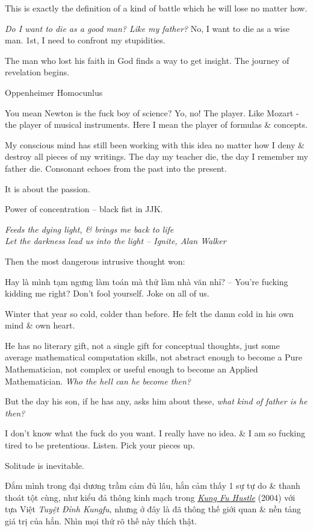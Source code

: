\documentclass[12pt,oneside]{book}
\begin{document}
This is exactly the definition of a kind of battle which he will lose no matter how.

{\it Do I want to die as a good man? Like my father?} No, I want to die as a wise man. 1st, I need to confront my stupidities.

The man who lost his faith in God finds a way to get insight. The journey of revelation begins.

Oppenheimer Homocunlus

You mean Newton is the fuck boy of science? Yo, no! The player. Like Mozart - the player of musical instruments. Here I mean the player of formulas \& concepts.

My conscious mind has still been working with this idea no matter how I deny \& destroy all pieces of my writings. The day my teacher die, the day I remember my father die. Consonant echoes from the past into the present. 

It is about the passion.

Power of concentration -- black fist in JJK.

\begin{center}\it
	Feeds the dying light, \& brings me back to life\\
	Let the darkness lead us into the light 
	-- Ignite, {\sc Alan Walker}
\end{center}
Then the most dangerous intrusive thought won:

Hay là mình tạm ngưng làm toán mà thử làm nhà văn nhỉ? -- You're fucking kidding me right? Don't fool yourself. Joke on all of us.

Winter that year so cold, colder than before. He felt the damn cold in his own mind \& own heart.

He has no literary gift, not a single gift for conceptual thoughts, just some average mathematical computation skills, not abstract enough to become a Pure Mathematician, not complex or useful enough to become an Applied Mathematician. {\it Who the hell can he become then?}

But the day his son, if he has any, asks him about these, {\it what kind of father is he then?}

I don't know what the fuck do you want. I really have no idea. \& I am so fucking tired to be pretentious. Listen. Pick your pieces up.

Solitude is inevitable.

Đắm mình trong đại dương trầm cảm đủ lâu, hắn cảm thấy 1 sự tự do \& thanh thoát tột cùng, như kiểu đả thông kinh mạch trong \href{https://www.imdb.com/title/tt0373074/}{\it Kung Fu Hustle} (2004) với tựa Việt {\it Tuyệt Đỉnh Kungfu}, nhưng ở đây là đã thông thế giới quan \& nền tảng giá trị của hắn. Nhìn mọi thứ rõ thế này thích thật.
\end{document}
